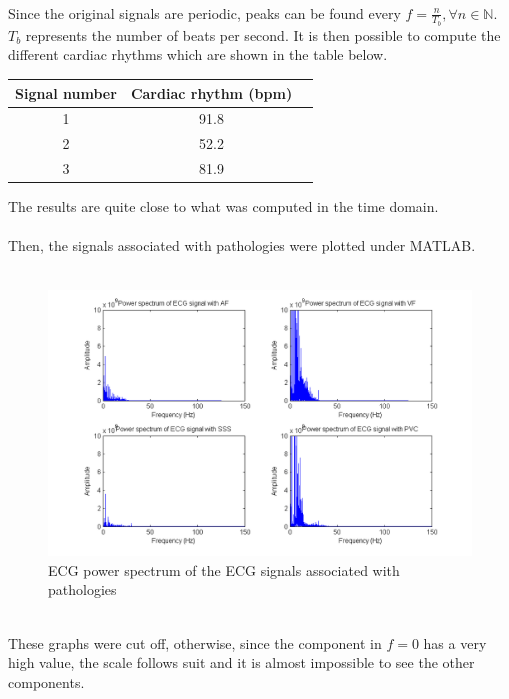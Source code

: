 \documentclass[11pt]{article}
\begin{document}
		\\
		Since the original signals are periodic, peaks can be found every $f = \frac{n}{T_b}, \forall n \in \mathbb{N}$.\\
		$T_b$ represents the number of beats per second. It is then possible to compute the different cardiac rhythms which are shown in the table below.\\
		\begin{center}
			\begin{tabular}{|c|c|c|}
				\hline
				\textbf{Signal number} & \textbf{Cardiac rhythm (bpm)} \\
				\hline
				1 & 91.8 \\ 
				\hline
				2 & 52.2 \\
				\hline
				3 & 81.9 \\
				\hline
			\end{tabular}
		\end{center}
		\vspace{0.3in}
		The results are quite close to what was computed in the time domain.\\
		\\
		Then, the signals associated with pathologies were plotted under MATLAB.\\
		\\
		\begin{figure}[ht]
			\centering
			\includegraphics[scale=0.65]{images/Q322.png}
			\caption{ECG power spectrum of the ECG signals associated with pathologies}
			\label{Q322}
		\end{figure}
		\\
		These graphs were cut off, otherwise, since the component in $f = 0$ has a very high value, the scale follows suit and it is almost impossible to see the other components.\\
\end{document}
